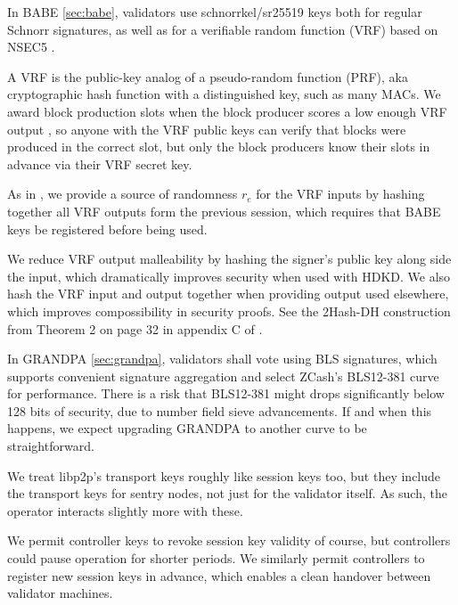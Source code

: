 In BABE \ref{sec:babe}, validators use schnorrkel/sr25519 keys both for regular Schnorr signatures, as well as for a verifiable random function (VRF) based on NSEC5 \cite{NSEC5}.  

A VRF is the public-key analog of a pseudo-random function (PRF), aka cryptographic hash function with a distinguished key, such as many MACs.  We award block production slots when the block producer scores a low enough VRF output , so anyone with the VRF public keys can verify that blocks were produced in the correct slot, but only the block producers know their slots in advance via their VRF secret key.

As in \cite{Praos}, we provide a source of randomness $r_e$ for the VRF inputs by hashing together all VRF outputs form the previous session, which requires that BABE keys be registered  before being used.

We reduce VRF output malleability by hashing the signer's public key along side the input, which dramatically improves security when used with HDKD.  We also hash the VRF input and output together when providing output used elsewhere, which improves compossibility in security proofs. See the 2Hash-DH construction from Theorem 2 on page 32 in appendix C of \cite{Praos}.  

In GRANDPA \ref{sec:grandpa}, validators shall vote using BLS signatures, which supports convenient signature aggregation and select ZCash's BLS12-381 curve for performance.  There is a risk that BLS12-381 might drops significantly below 128 bits of security, due to number field sieve advancements.  If and when this happens, we expect upgrading GRANDPA to another curve to be straightforward. 


We treat libp2p's transport keys roughly like session keys too, but they include the transport keys for sentry nodes, not just for the validator itself.  As such, the operator interacts slightly more with these.

We permit controller keys to revoke session key validity of course, but controllers could pause operation for shorter periods.  We similarly permit controllers to register new session keys in advance, which enables a clean handover between validator machines.

